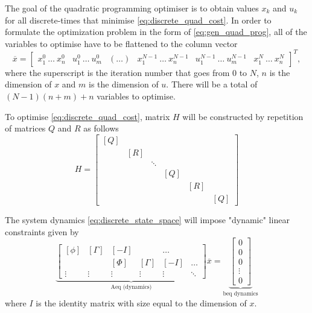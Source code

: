 \par The goal of the quadratic programming optimiser is to obtain values $x_k$ and $u_k$ for all discrete-times that minimise \ref{eq:discrete_quad_cost}. In order to formulate the optimization problem in the form of \ref{eq:gen_quad_prog}, all of the variables to optimise have to be flattened to the column vector \begin{equation}
    \label{eq:quad_prog_xbar}
    \overline{x} = \begin{bmatrix} x^0_1\ \dots \ x^0_n & u_1^0\ \dots\ u_m^0 & (\dots) & x_1^{N-1}\ \dots\ x_n^{N-1} & u_1^{N-1}\ \dots\ u_m^{N-1} &  x_1^N\ \dots\ x_n^N \end{bmatrix} ^T,
\end{equation}
where the superscript is the iteration number that goes from 0 to $N$, $n$ is the dimension of $x$ and $m$ is the dimension of $u$. There will be a total of $(N-1)(n+m)+n$ variables to optimise.
\par To optimise \ref{eq:discrete_quad_cost}, matrix $H$ will be constructed by repetition of matrices $Q$ and $R$ as follows
\begin{equation}
    \label{eq:quad_prog_h}
    H = \begin{bmatrix}
        [Q] & & & & & \\
        & [R] & & & &  \\
        & & \ddots & & & \\
        & & & [Q] & & \\
        & & & & [R] & \\
        & & & & & [Q]
    \end{bmatrix}
\end{equation}

\par The system dynamics \ref{eq:discrete_state_space} will impose "dynamic" linear constraints given by
\begin{equation}
    \label{eq:quad_prog_Aeq_dyn}
    \underbrace{\begin{bmatrix}
        [\phi] & \left[\Gamma\right] & \left[ -I \right] & & \ldots \\
        & & [\Phi] & [\Gamma] & \left[ -I \right] & \ldots \\
        \vdots & \vdots & \vdots & \vdots & \vdots & \ddots 
    \end{bmatrix}}_\text{Aeq (dynamics)}
    \overline{x} = \underbrace{\begin{bmatrix} 0 \\ 0 \\ 0 \\ \vdots \\ 0 \end{bmatrix}}_\text{beq dynamics}
\end{equation}
where $I$ is the identity matrix with size equal to the dimension of $x$.

